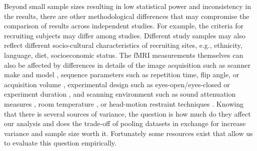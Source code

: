 \documentclass[authoryear]{elsarticle}
\begin{document}

Beyond small sample sizes resulting in low statistical power \citep{Kelly2012a} and inconsistency in the results, there are other methodological differences that may compromise the comparison of results across independent studies. For example, the criteria for recruiting subjects may differ among studies. Different study samples may also reflect different socio-cultural characteristics of recruiting sites, e.g., ethnicity, language, diet, socioeconomic status. The fMRI measurements themselves can also be affected by differences in details of the image acquisition such as scanner make and model \citep{Friedman2006}, sequence parameters such as repetition time, flip angle, or acquisition volume \citep{Friedman2006a}, experimental design such as eyes-open/eyes-closed \citep{Yan2009} or experiment duration \citep{VanDijk2010}, and scanning environment such as sound attenuation measures \citep{Elliott1999}, room temperature \citep{Vanhoutte2006}, or head-motion restraint techniques \citep{Edward2000}. 
Knowing that there is several sources of variance, the question is how much do they affect our analysis and does the trade-off of pooling datasets in exchange for increase variance and sample size worth it. Fortunately some resources exist that allow us to evaluate this question  empirically. 
\end{document}
